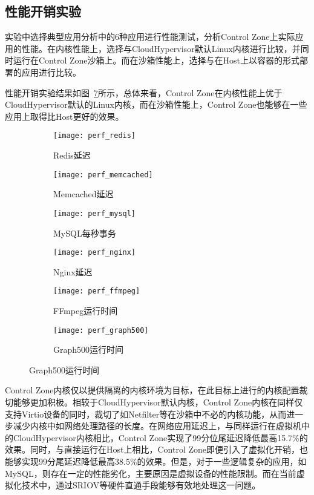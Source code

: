 \subsection{性能开销实验}

实验中选择典型应用分析中的6种应用进行性能测试，分析Control Zone上实际应用的性能。在内核性能上，选择与CloudHypervisor默认Linux内核进行比较，并同时运行在Control Zone沙箱上。而在沙箱性能上，选择与在Host上以容器的形式部署的应用进行比较。

性能开销实验结果如图~\ref{fig:perf_app}所示，总体来看，Control Zone在内核性能上优于CloudHypervisor默认的Linux内核，而在沙箱性能上，Control Zone也能够在一些应用上取得比Host更好的效果。

\begin{figure}[!htbp]
    \centering
    \begin{subfigure}[b]{0.32\textwidth}
        \texttt{[image: perf\_redis]}
        \caption{\quad Redis延迟}
        \label{fig:perf_redis}
    \end{subfigure}
    \begin{subfigure}[b]{0.32\textwidth}
        \texttt{[image: perf\_memcached]}
        \caption{\quad Memcached延迟}
        \label{fig:perf_memcached}
    \end{subfigure}
    \begin{subfigure}[b]{0.32\textwidth}
        \texttt{[image: perf\_mysql]}
        \caption{\quad MySQL每秒事务}
        \label{fig:perf_mysql}
    \end{subfigure}
    \begin{subfigure}[b]{0.32\textwidth}
        \texttt{[image: perf\_nginx]}
        \caption{\quad Nginx延迟}
        \label{fig:perf_nginx}
    \end{subfigure}
    \begin{subfigure}[b]{0.32\textwidth}
        \texttt{[image: perf\_ffmpeg]}
        \caption{\quad FFmpeg运行时间}
        \label{fig:perf_ffmpeg}
    \end{subfigure}
    \begin{subfigure}[b]{0.32\textwidth}
        \texttt{[image: perf\_graph500]}
        \caption{\quad Graph500运行时间}
        \label{fig:perf_graph500}
    \end{subfigure}
\label{fig:perf_app}
\end{figure}

Control Zone内核仅以提供隔离的内核环境为目标，在此目标上进行的内核配置裁切能够更加积极。相较于CloudHypervisor默认内核，Control Zone内核在同样仅支持Virtio设备的同时，裁切了如Netfilter等在沙箱中不必的内核功能，从而进一步减少内核中如网络处理路径的长度。在网络应用延迟上，与同样运行在虚拟机中的CloudHypervisor内核相比，Control Zone实现了99分位尾延迟降低最高15.7\%的效果。同时，与直接运行在Host上相比，Control Zone即便引入了虚拟化开销，也能够实现99分尾延迟降低最高38.5\%的效果。但是，对于一些逻辑复杂的应用，如MySQL，则存在一定的性能劣化，主要原因是虚拟设备的性能限制。而在当前虚拟化技术中，通过SRIOV等硬件直通手段能够有效地处理这一问题。

